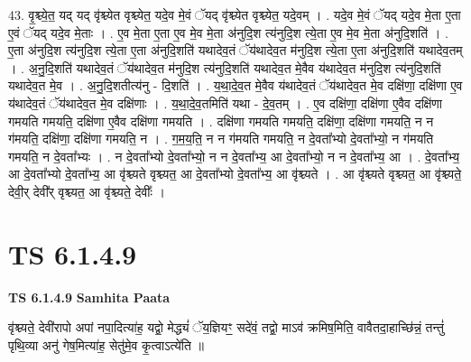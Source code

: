 \documentclass[17pt]{extarticle}
\begin{document}
43. वृ॒श्च्ये॒त॒ यद् यद् वृ॑श्च्येत वृश्च्येत॒ यदे॒व मे॒वं ॅयद् वृ॑श्च्येत वृश्च्येत॒ यदे॒वम् । . यदे॒व मे॒वं ॅयद् यदे॒व मे॒ता ए॒ता ए॒वं ॅयद् यदे॒व मे॒ताः । . ए॒व मे॒ता ए॒ता ए॒व मे॒व मे॒ता अ॑नुदि॒श त्य॑नुदि॒श त्ये॒ता ए॒व मे॒व मे॒ता अ॑नुदि॒शति॑ । . ए॒ता अ॑नुदि॒श त्य॑नुदि॒श त्ये॒ता ए॒ता अ॑नुदि॒शति॑ यथादेव॒तं ॅय॑थादेव॒त म॑नुदि॒श त्ये॒ता ए॒ता अ॑नुदि॒शति॑ यथादेव॒तम् । . अ॒नु॒दि॒शति॑ यथादेव॒तं ॅय॑थादेव॒त म॑नुदि॒श त्य॑नुदि॒शति॑ यथादेव॒त मे॒वैव य॑थादेव॒त म॑नुदि॒श त्य॑नुदि॒शति॑ यथादेव॒त मे॒व । . अ॒नु॒दि॒शतीत्य॑नु - दि॒शति॑ । . य॒था॒दे॒व॒त मे॒वैव य॑थादेव॒तं ॅय॑थादेव॒त मे॒व दक्षि॑णा॒ दक्षि॑णा ए॒व य॑थादेव॒तं ॅय॑थादेव॒त मे॒व दक्षि॑णाः । . य॒था॒दे॒व॒तमिति॑ यथा - दे॒व॒तम् । . ए॒व दक्षि॑णा॒ दक्षि॑णा ए॒वैव दक्षि॑णा गमयति गमयति॒ दक्षि॑णा ए॒वैव दक्षि॑णा गमयति । . दक्षि॑णा गमयति गमयति॒ दक्षि॑णा॒ दक्षि॑णा गमयति॒ न न ग॑मयति॒ दक्षि॑णा॒ दक्षि॑णा गमयति॒ न । . ग॒म॒य॒ति॒ न न ग॑मयति गमयति॒ न दे॒वता᳚भ्यो दे॒वता᳚भ्यो॒ न ग॑मयति गमयति॒ न दे॒वता᳚भ्यः । . न दे॒वता᳚भ्यो दे॒वता᳚भ्यो॒ न न दे॒वता᳚भ्य॒ आ दे॒वता᳚भ्यो॒ न न दे॒वता᳚भ्य॒ आ । . दे॒वता᳚भ्य॒ आ दे॒वता᳚भ्यो दे॒वता᳚भ्य॒ आ वृ॑श्च्यते वृश्च्यत॒ आ दे॒वता᳚भ्यो दे॒वता᳚भ्य॒ आ वृ॑श्च्यते । . आ वृ॑श्च्यते वृश्च्यत॒ आ वृ॑श्च्यते॒ देवी॒र् देवी᳚र् वृश्च्यत॒ आ वृ॑श्च्यते॒ देवीः᳚ । \newline
\pagebreak
{}

\section{ TS 6.1.4.9 }

\textbf{TS 6.1.4.9 } \newline
\textbf{Samhita Paata} \newline

वृ॑श्च्यते॒ देवी॑रापो अपां नपा॒दित्या॑ह॒ यद्वो॒ मेद्ध्यं॑ ॅय॒ज्ञियꣳ॒॒ सदे॑वं॒ तद्वो॒ माऽव॑ क्रमिष॒मिति॒ वावैतदा॒हाच्छि॑न्नं॒ तन्तुं॑ पृथि॒व्या अनु॑ गेष॒मित्या॑ह॒ सेतु॑मे॒व कृ॒त्वाऽत्ये॑ति ॥ \newline
\end{document}
